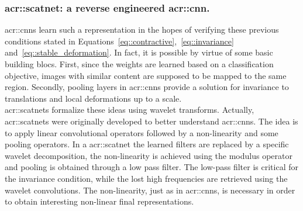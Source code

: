         \subsubsection{\gls*{acr::scatnet}: a reverse engineered \gls*{acr::cnn}.}
            \glspl{acr::cnn} learn such a representation in the hopes of verifying these previous conditions stated in Equations~\ref{eq::contractive},~\ref{eq::invariance} and~\ref{eq::stable_deformation}.
            In fact, it is possible by virtue of some basic building blocs.
            First, since the weights are learned based on a classification objective, images with similar content are supposed to be mapped to the same region.
            Secondly, pooling layers in \glspl{acr::cnn} provide a solution for invariance to translations and local deformations up to a scale.\\

            \glspl{acr::scatnet} formalize these ideas using wavelet transforms.
            Actually, \glspl{acr::scatnet} were originally developed to better understand \glspl{acr::cnn}.
            The idea is to apply linear convolutional operators followed by a non-linearity and some pooling operators.
            In a \gls{acr::scatnet} the learned filters are replaced by a specific wavelet decomposition, the non-linearity is achieved using the modulus operator and pooling is obtained through a low pass filter.
            The low-pass filter is critical for the invariance condition, while the lost high frequencies are retrieved using the wavelet convolutions.
            The non-linearity, just as in \glspl{acr::cnn}, is necessary in order to obtain interesting non-linear final representations.\\

